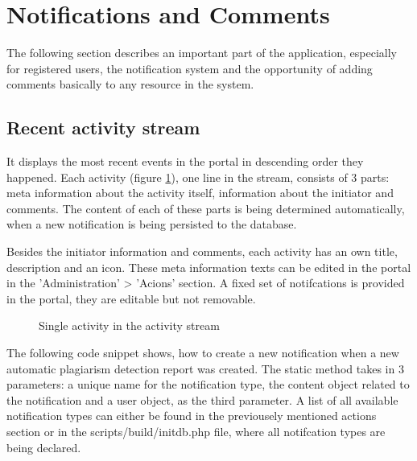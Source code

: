 \section{Notifications and Comments}

The following section describes an important part of the application, especially for registered users, the notification system and the opportunity of adding comments basically to any resource in the system.

\subsection{Recent activity stream}
It displays the most recent events in the portal in descending order they happened. Each activity (figure \ref{fig:activity-stream-single-activity}), one line in the stream, consists of 3 parts: meta information about the activity itself, information about the initiator and comments. The content of each of these parts is being determined automatically, when a new notification is being persisted to the database.

Besides the initiator information and comments, each activity has an own title, description and an icon. These meta information texts can be edited in the portal in the 'Administration' > 'Acions' section. A fixed set of notifcations is provided in the portal, they are editable but not removable.

\begin{figure}[!h]
  \centering
  \caption{Single activity in the activity stream}
  \label{fig:activity-stream-single-activity}
\end{figure}

The following code snippet shows, how to create a new notification when a new automatic plagiarism detection report was created. The static method takes in 3 parameters: a unique name for the notification type, the content object related to the notification and a user object, as the third parameter. A list of all available notification types can either be found in the previousely mentioned actions section or in the scripts/build/initdb.php file, where all notifcation types are being declared.

